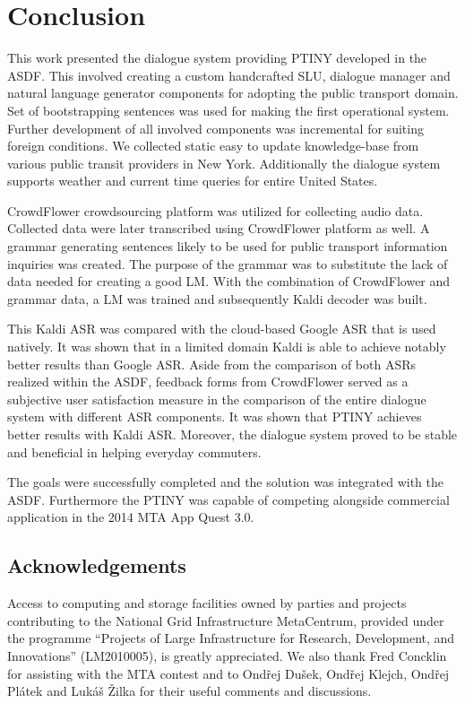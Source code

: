 \chapter*{Conclusion}

This work presented the dialogue system providing \acf{PTINY} developed in the \acf{ASDF}.
This involved creating a custom handcrafted \acf{SLU}, dialogue manager and natural language generator components for adopting the public transport domain.
Set of bootstrapping sentences was used for making the first operational system.
Further development of all involved components was incremental for suiting foreign conditions.
We collected static easy to update knowledge-base from various public transit providers in New York.
Additionally the dialogue system supports weather and current time queries for entire United States.

CrowdFlower crowdsourcing platform was utilized for collecting audio data.
Collected data were later transcribed using CrowdFlower platform as well.
A grammar generating sentences likely to be used for public transport information inquiries was created.
The purpose of the grammar was to substitute the lack of data needed for creating a good \acf{LM}.
With the combination of CrowdFlower and grammar data, a \ac{LM} was trained and subsequently Kaldi decoder was built.

This Kaldi \ac{ASR} was compared with the cloud-based Google \ac{ASR} that is used natively.
It was shown that in a limited domain Kaldi is able to achieve notably better results than Google \ac{ASR}.
Aside from the comparison of both \acp{ASR} realized within the \ac{ASDF}, feedback forms from CrowdFlower served as a subjective user satisfaction measure in the comparison of the entire dialogue system with different \ac{ASR} components.
It was shown that \ac{PTINY} achieves better results with Kaldi \ac{ASR}.
Moreover, the dialogue system proved to be stable and beneficial in helping everyday commuters.

The goals were successfully completed and the solution was integrated with the \ac{ASDF}.
Furthermore the \ac{PTINY} was capable of competing alongside commercial application in the 2014 \ac{MTA} App Quest 3.0.


\section{Acknowledgements}

Access to computing and storage facilities owned by parties and projects contributing to the National Grid Infrastructure MetaCentrum, provided under the programme ``Projects of Large Infrastructure for Research, Development, and Innovations'' (LM2010005), is greatly appreciated. We also thank Fred Concklin for assisting with the \ac{MTA} contest and to Ondřej Dušek, Ondřej Klejch, Ondřej Plátek and Lukáš Žilka for their useful comments and discussions.


